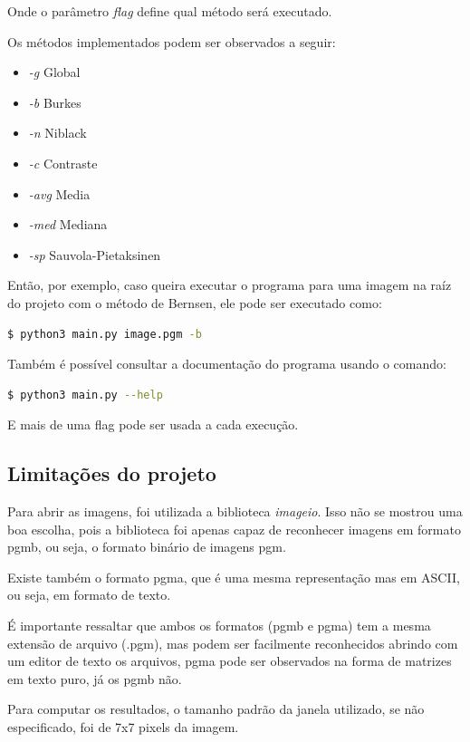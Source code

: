 \documentclass[conference]{IEEEtran}
\begin{document}
Onde o parâmetro \textit{flag} define qual método será executado.

Os métodos implementados podem ser observados a seguir:

\begin{itemize}
    \item \textit{-g} Global
    \item \textit{-b} Burkes
    \item \textit{-n} Niblack
    \item \textit{-c} Contraste
    \item \textit{-avg} Media
    \item \textit{-med} Mediana
    \item \textit{-sp} Sauvola-Pietaksinen
\end{itemize}

Então, por exemplo, caso queira executar o programa para uma imagem na raíz do projeto com o método de Bernsen, ele pode ser executado como:

\begin{lstlisting}[language=bash]
$ python3 main.py image.pgm -b
\end{lstlisting}

Também é possível consultar a documentação do programa usando o comando:

\begin{lstlisting}[language=bash]
$ python3 main.py --help
\end{lstlisting}

E mais de uma flag pode ser usada a cada execução.

\subsection{Limitações do projeto}

Para abrir as imagens, foi utilizada a biblioteca \textit{imageio}. Isso não se mostrou uma boa escolha, pois a biblioteca foi apenas capaz de reconhecer imagens em formato pgmb, ou seja, o formato binário de imagens pgm.

Existe também o formato pgma, que é uma mesma representação mas em ASCII, ou seja, em formato de texto.

É importante ressaltar que ambos os formatos (pgmb e pgma) tem a mesma extensão de arquivo (.pgm), mas podem ser facilmente reconhecidos abrindo com um editor de texto os arquivos, pgma pode ser observados na forma de matrizes em texto puro, já os pgmb não.

Para computar os resultados, o tamanho padrão da janela utilizado, se não especificado, foi de 7x7 pixels da imagem.
\end{document}
